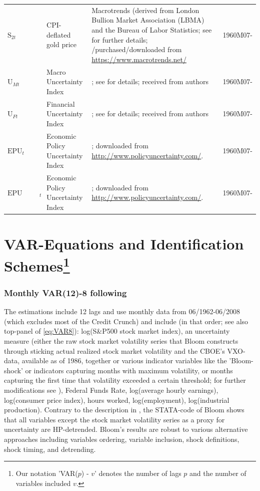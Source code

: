 \documentclass[a4paper,11pt,listof=nochaptergap,oneside,pointednumbers,bibtotoc,bigheadings,liststotoc,hidelinks]{scrbook}
\theoremstyle{mysatz}
\theoremstyle{mydefinition}
\theoremstyle{mytheorem}
\theoremstyle{mybemerkung}
\begin{document}
\begin{table}[!h]
{{\begin{tabular}{L{2.7cm}p{5.0cm}p{6.0cm}L{2.5cm}}
          $\text{S}_{2t}$ & CPI-deflated gold price & Macrotrends (derived from London Bullion Market Association (LBMA) and the Bureau of Labor Statistics; see \citet{ludvigsonetal:19} for further details; /purchased/downloaded from \url{https://www.macrotrends.net/} & 1960M07- \\
 	$\text{U}_{Mt}$ & Macro Uncertainty Index & \citet{juradoetal:15}; see \citet{ludvigsonetal:19} for details; received from authors &  1960M07- \\
	$\text{U}_{Ft}$ & Financial Uncertainty Index & ; see \citet{ludvigsonetal:19} for details; received from authors & 1960M07- \\
	$\text{EPU}_t$ & Economic Policy Uncertainty Index & \citet{bakeretal:15}; downloaded from \url{http://www.policyuncertainty.com/}. & 1960M07- \\
	$\text{EPU Historical}_t$ & Economic Policy Uncertainty Index & \citet{bakeretal:15}; downloaded from \url{http://www.policyuncertainty.com/}. & 1960M07- \\
        \bottomrule
\end{tabular}
}
}
\label{tab:data_sources} %
\end{table}


\section[VAR-Equations and Identification Schemes]{VAR-Equations and Identification Schemes\footnote{Our notation 'VAR($p$) - $v$' denotes the number of lags $p$ and the number of variables included $v$.}}
\label{sec:VAREquations}
\subsubsection{Monthly VAR(12)-8 following \citet{bloom:09}}
The estimations include 12 lags and use monthly data from 06/1962-06/2008 (which excludes most of the Credit Crunch) and include (in that order; see also top-panel of \ref{eq:VAR8}): log(S\&P500 stock market index), an uncertainty measure (either the raw stock market volatility series that Bloom constructs through sticking actual realized stock market volatility and the CBOE's VXO-data, available as of 1986, together or various indicator variables like the 'Bloom-shock' or indicators capturing months with maximum volatility, or months capturing the first time that volatility exceeded a certain threshold; for further modifications see \citealp{bloom:09}), Federal Funds Rate, log(average hourly earnings), log(consumer price index), hours worked, log(employment), log(industrial production). Contrary to the description in \citet{bloom:09}, the STATA-code of Bloom shows that all variables except the stock market volatility series as a proxy for uncertainty are HP-detrended. Bloom's results are robust to various alternative approaches including variables ordering, variable inclusion, shock definitions, shock timing, and detrending.\\
\end{document}
